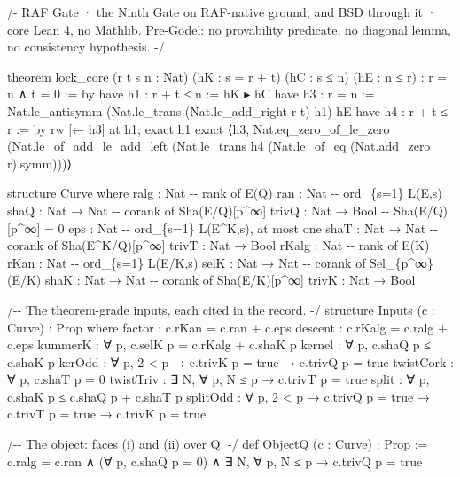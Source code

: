 \documentclass[10pt,twocolumn]{article}
\newenvironment{Shaded}{}{}
\newcommand{\NormalTok}[1]{#1}
\providecommand{\NormalTok}[1]{#1}
\providecommand{\NormalTok}[1]{#1}
\begin{document}
\begin{strip}
\begin{Shaded}
\begin{Highlighting}[]
\NormalTok{/{-}}
\NormalTok{  RAF Gate · the Ninth Gate on RAF{-}native ground, and BSD through it · core Lean 4, no Mathlib.}
\NormalTok{  Pre{-}Gödel: no provability predicate, no diagonal lemma, no consistency hypothesis.}
\NormalTok{{-}/}

\NormalTok{theorem lock\_core (r t s n : Nat) (hK : s = r + t) (hC : s ≤ n) (hE : n ≤ r) : r = n ∧ t = 0 := by}
\NormalTok{  have h1 : r + t ≤ n := hK ▸ hC}
\NormalTok{  have h3 : r = n := Nat.le\_antisymm (Nat.le\_trans (Nat.le\_add\_right r t) h1) hE}
\NormalTok{  have h4 : r + t ≤ r := by rw [← h3] at h1; exact h1}
\NormalTok{  exact ⟨h3, Nat.eq\_zero\_of\_le\_zero (Nat.le\_of\_add\_le\_add\_left (Nat.le\_trans h4 (Nat.le\_of\_eq (Nat.add\_zero r).symm)))⟩}

\NormalTok{structure Curve where}
\NormalTok{  ralg : Nat            {-}{-} rank of E(Q)}
\NormalTok{  ran : Nat             {-}{-} ord\_\{s=1\} L(E,s)}
\NormalTok{  shaQ : Nat → Nat      {-}{-} corank of Sha(E/Q)[p\^{}∞]}
\NormalTok{  trivQ : Nat → Bool    {-}{-} Sha(E/Q)[p\^{}∞] = 0}
\NormalTok{  eps : Nat             {-}{-} ord\_\{s=1\} L(E\^{}K,s), at most one}
\NormalTok{  shaT : Nat → Nat      {-}{-} corank of Sha(E\^{}K/Q)[p\^{}∞]}
\NormalTok{  trivT : Nat → Bool}
\NormalTok{  rKalg : Nat           {-}{-} rank of E(K)}
\NormalTok{  rKan : Nat            {-}{-} ord\_\{s=1\} L(E/K,s)}
\NormalTok{  selK : Nat → Nat      {-}{-} corank of Sel\_\{p\^{}∞\}(E/K)}
\NormalTok{  shaK : Nat → Nat      {-}{-} corank of Sha(E/K)[p\^{}∞]}
\NormalTok{  trivK : Nat → Bool}

\NormalTok{/{-}{-} The theorem{-}grade inputs, each cited in the record. {-}/}
\NormalTok{structure Inputs (c : Curve) : Prop where}
\NormalTok{  factor    : c.rKan = c.ran + c.eps}
\NormalTok{  descent   : c.rKalg = c.ralg + c.eps}
\NormalTok{  kummerK   : ∀ p, c.selK p = c.rKalg + c.shaK p}
\NormalTok{  kernel    : ∀ p, c.shaQ p ≤ c.shaK p}
\NormalTok{  kerOdd    : ∀ p, 2 \textless{} p → c.trivK p = true → c.trivQ p = true}
\NormalTok{  twistCork : ∀ p, c.shaT p = 0}
\NormalTok{  twistTriv : ∃ N, ∀ p, N ≤ p → c.trivT p = true}
\NormalTok{  split     : ∀ p, c.shaK p ≤ c.shaQ p + c.shaT p}
\NormalTok{  splitOdd  : ∀ p, 2 \textless{} p → c.trivQ p = true → c.trivT p = true → c.trivK p = true}

\NormalTok{/{-}{-} The object: faces (i) and (ii) over Q. {-}/}
\NormalTok{def ObjectQ (c : Curve) : Prop :=}
\NormalTok{  c.ralg = c.ran ∧ (∀ p, c.shaQ p = 0) ∧ ∃ N, ∀ p, N ≤ p → c.trivQ p = true}


\end{Highlighting}
\end{Shaded}
\end{strip}
\end{document}
